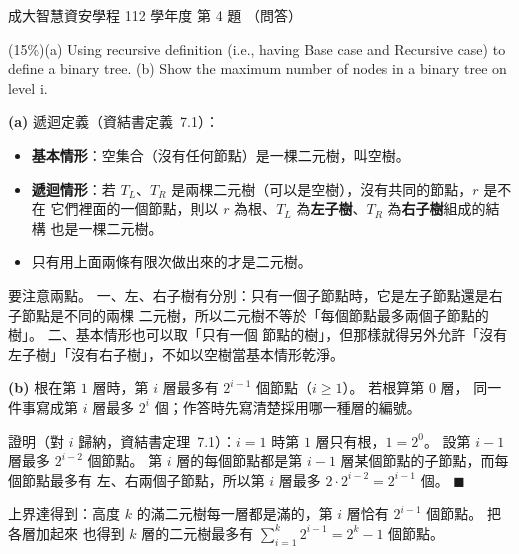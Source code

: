 \begin{pastexam}[label={px:ncku-112-isec-ds-04}]{成大智慧資安學程 112 學年度 第 4 題}
（問答）

(15\%)(a) Using recursive definition (i.e., having Base case and Recursive case) to define a
binary tree. (b) Show the maximum number of nodes in a binary tree on level i.
\end{pastexam}

\begin{pastsoln}
\textbf{(a)} 遞迴定義（資結書定義~7.1）：
\begin{itemize}
\item \textbf{基本情形}：空集合（沒有任何節點）是一棵二元樹，叫空樹。
\item \textbf{遞迴情形}：若 $T_L$、$T_R$ 是兩棵二元樹（可以是空樹），沒有共同的節點，$r$ 是不在
它們裡面的一個節點，則以 $r$ 為根、$T_L$ 為\textbf{左子樹}、$T_R$ 為\textbf{右子樹}組成的結構
也是一棵二元樹。
\item 只有用上面兩條有限次做出來的才是二元樹。
\end{itemize}
要注意兩點。 一、左、右子樹有分別：只有一個子節點時，它是左子節點還是右子節點是不同的兩棵
二元樹，所以二元樹不等於「每個節點最多兩個子節點的樹」。 二、基本情形也可以取「只有一個
節點的樹」，但那樣就得另外允許「沒有左子樹」「沒有右子樹」，不如以空樹當基本情形乾淨。

\textbf{(b)} 根在第 $1$ 層時，第 $i$ 層最多有 $2^{i-1}$ 個節點（$i \ge 1$）。 若根算第 $0$ 層，
同一件事寫成第 $i$ 層最多 $2^i$ 個；作答時先寫清楚採用哪一種層的編號。

證明（對 $i$ 歸納，資結書定理~7.1）：$i = 1$ 時第 $1$ 層只有根，$1 = 2^0$。 設第 $i - 1$ 層最多
$2^{i-2}$ 個節點。 第 $i$ 層的每個節點都是第 $i - 1$ 層某個節點的子節點，而每個節點最多有
左、右兩個子節點，所以第 $i$ 層最多 $2 \cdot 2^{i-2} = 2^{i-1}$ 個。 \hfill$\blacksquare$

上界達得到：高度 $k$ 的滿二元樹每一層都是滿的，第 $i$ 層恰有 $2^{i-1}$ 個節點。 把各層加起來
也得到 $k$ 層的二元樹最多有 $\sum_{i=1}^{k} 2^{i-1} = 2^k - 1$ 個節點。
\end{pastsoln}
